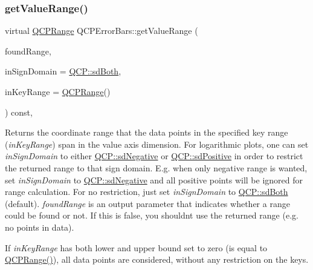 \subsubsection{\texorpdfstring{get\+Value\+Range()}{getValueRange()}\hspace{0.1cm}{\footnotesize\ttfamily [2/2]}}
{\footnotesize\ttfamily virtual \hyperlink{class_q_c_p_range}{Q\+C\+P\+Range} Q\+C\+P\+Error\+Bars\+::get\+Value\+Range (\begin{DoxyParamCaption}\item[{bool \&}]{found\+Range,  }\item[{\hyperlink{namespace_q_c_p_afd50e7cf431af385614987d8553ff8a9}{Q\+C\+P\+::\+Sign\+Domain}}]{in\+Sign\+Domain = {\ttfamily \hyperlink{namespace_q_c_p_afd50e7cf431af385614987d8553ff8a9a3dee7e9cd2fedce9253b83e172626a6c}{Q\+C\+P\+::sd\+Both}},  }\item[{const \hyperlink{class_q_c_p_range}{Q\+C\+P\+Range} \&}]{in\+Key\+Range = {\ttfamily \hyperlink{class_q_c_p_range}{Q\+C\+P\+Range}()} }\end{DoxyParamCaption}) const\hspace{0.3cm}{\ttfamily [protected]}, {\ttfamily [virtual]}}

Returns the coordinate range that the data points in the specified key range ({\itshape in\+Key\+Range}) span in the value axis dimension. For logarithmic plots, one can set {\itshape in\+Sign\+Domain} to either \hyperlink{namespace_q_c_p_afd50e7cf431af385614987d8553ff8a9a0b464fa3135be2808909739a969193c9}{Q\+C\+P\+::sd\+Negative} or \hyperlink{namespace_q_c_p_afd50e7cf431af385614987d8553ff8a9a23362334a52289677a51526a9b68db6c}{Q\+C\+P\+::sd\+Positive} in order to restrict the returned range to that sign domain. E.\+g. when only negative range is wanted, set {\itshape in\+Sign\+Domain} to \hyperlink{namespace_q_c_p_afd50e7cf431af385614987d8553ff8a9a0b464fa3135be2808909739a969193c9}{Q\+C\+P\+::sd\+Negative} and all positive points will be ignored for range calculation. For no restriction, just set {\itshape in\+Sign\+Domain} to \hyperlink{namespace_q_c_p_afd50e7cf431af385614987d8553ff8a9a3dee7e9cd2fedce9253b83e172626a6c}{Q\+C\+P\+::sd\+Both} (default). {\itshape found\+Range} is an output parameter that indicates whether a range could be found or not. If this is false, you shouldn\textquotesingle{}t use the returned range (e.\+g. no points in data).

If {\itshape in\+Key\+Range} has both lower and upper bound set to zero (is equal to {\ttfamily \hyperlink{class_q_c_p_range}{Q\+C\+P\+Range()}}), all data points are considered, without any restriction on the keys.

